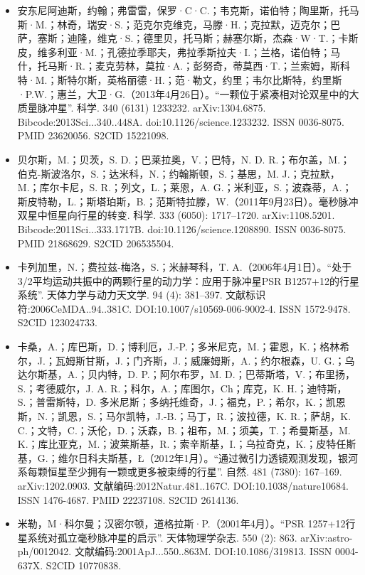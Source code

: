 \begin{itemize}
\item 安东尼阿迪斯，约翰；弗雷雷，保罗·C·C.；韦克斯，诺伯特；陶里斯，托马斯·M.；林奇，瑞安·S.；范克尔克维克，马滕·H.；克拉默，迈克尔；巴萨，塞斯；迪隆，维克·S.；德里贝，托马斯；赫塞尔斯，杰森·W·T.；卡斯皮，维多利亚·M.；孔德拉季耶夫，弗拉季斯拉夫·I.；兰格，诺伯特；马什，托马斯·R.；麦克劳林，莫拉·A.；彭努奇，蒂莫西·T.；兰索姆，斯科特·M.；斯特尔斯，英格丽德·H.；范·勒文，约里；韦尔比斯特，约里斯·P.W.；惠兰，大卫·G.（2013年4月26日）。“一颗位于紧凑相对论双星中的大质量脉冲星”. 科学. 340 (6131) 1233232. arXiv:1304.6875. Bibcode:2013Sci...340..448A. doi:10.1126/science.1233232. ISSN 0036-8075. PMID 23620056. S2CID 15221098.
\item 贝尔斯，M.；贝茨，S. D.；巴莱拉奥，V.；巴特，N. D. R.；布尔盖，M.；伯克-斯波洛尔，S.；达米科，N.；约翰斯顿，S.；基思，M. J.；克拉默，M.；库尔卡尼，S. R.；列文，L.；莱恩，A. G.；米利亚，S.；波森蒂，A.；斯皮特勒，L.；斯塔珀斯，B.；范斯特拉滕，W.（2011年9月23日）。毫秒脉冲双星中恒星向行星的转变. 科学. 333 (6050): 1717–1720. arXiv:1108.5201. Bibcode:2011Sci...333.1717B. doi:10.1126/science.1208890. ISSN 0036-8075. PMID 21868629. S2CID 206535504.
\item 卡列加里，N.；费拉兹-梅洛，S.；米赫琴科，T. A.（2006年4月1日）。“处于3/2平均运动共振中的两颗行星的动力学：应用于脉冲星PSR B1257+12的行星系统”. 天体力学与动力天文学. 94 (4): 381–397. 文献标识符:2006CeMDA..94..381C. DOI:10.1007/s10569-006-9002-4. ISSN 1572-9478. S2CID 123024733.
\item 卡桑，A.；库巴斯，D.；博利厄，J.-P.；多米尼克，M.；霍恩，K.；格林希尔，J.；瓦姆斯甘斯，J.；门齐斯，J.；威廉姆斯，A.；约尔根森，U. G.；乌达尔斯基，A.；贝内特，D. P.；阿尔布罗，M. D.；巴蒂斯塔，V.；布里扬，S.；考德威尔，J. A. R.；科尔，A.；库图尔，Ch；库克，K. H.；迪特斯，S.；普雷斯特，D. 多米尼斯；多纳托维奇，J.；福克，P.；希尔，K.；凯恩斯，N.；凯恩，S.；马尔凯特，J.-B.；马丁，R.；波拉德，K. R.；萨胡，K. C.；文特，C.；沃伦，D.；沃森，B.；祖布，M.；须美，T.；希曼斯基，M. K.；库比亚克，M.；波莱斯基，R.；索辛斯基，I.；乌拉奇克，K.；皮特任斯基，G.；维尔日科夫斯基，Ł（2012年1月）。“通过微引力透镜观测发现，银河系每颗恒星至少拥有一颗或更多被束缚的行星”. 自然. 481 (7380): 167–169. arXiv:1202.0903. 文献编码:2012Natur.481..167C. DOI:10.1038/nature10684. ISSN 1476-4687. PMID 22237108. S2CID 2614136.
\item 米勒，M·科尔曼；汉密尔顿，道格拉斯·P.（2001年4月）。“PSR 1257+12行星系统对孤立毫秒脉冲星的启示”. 天体物理学杂志. 550 (2): 863. arXiv:astro-ph/0012042. 文献编码:2001ApJ...550..863M. DOI:10.1086/319813. ISSN 0004-637X. S2CID 10770838.

\end{itemize}
